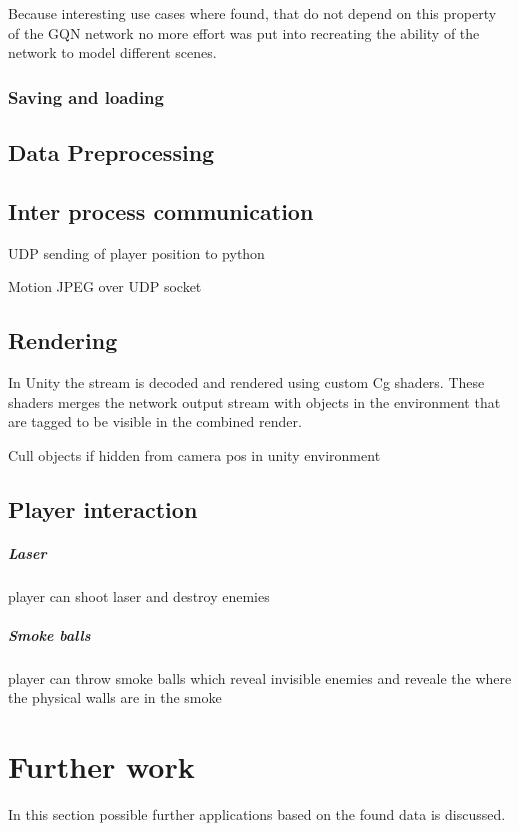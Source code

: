 \documentclass[a4paper, twoside, 10pt]{report}
\begin{document}
Because interesting use cases where found, that do not depend on this property of the GQN network no more effort was put into recreating the ability of the network to model different scenes.

\subsection{Saving and loading}
\section{Data Preprocessing}
\section{Inter process communication}
UDP sending of player position to python

Motion JPEG over UDP socket 

\section{Rendering}
In Unity the stream is decoded and rendered using custom Cg shaders. These shaders merges the network output stream with objects in the environment that are tagged to be visible in the combined render.

Cull objects if hidden from camera pos in unity environment

\section{Player interaction}
\paragraph{Laser}
player can shoot laser and destroy enemies

\paragraph{Smoke balls}
player can throw smoke balls which reveal invisible enemies and reveale the where the physical walls are in the smoke



\chapter{Further work}
In this section possible further applications based on the found data is discussed.
\end{document}
